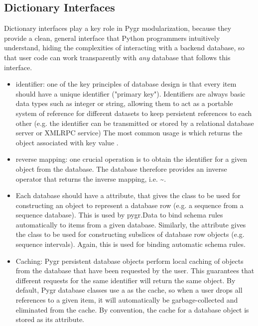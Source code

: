 \documentclass{howto}
\begin{document}
\subsection{Dictionary Interfaces}
Dictionary interfaces play a key role in Pygr modularization, because they
provide a clean, general interface that Python programmers intuitively
understand, hiding the complexities of interacting with a backend database,
so that user code can work transparently with {\em any} database that
follows this interface.
\begin{itemize}
\item identifier: one of the key principles of database
design is that every item should have a unique identifier ("primary key").
Identifiers are always basic data types such as integer or string, allowing
them to act as a portable system of reference for different datasets to keep
persistent references to each other (e.g. the identifier can be transmitted  
or stored by a relational database server or XMLRPC service)
The most common usage is  which returns the object associated
with key value .

\item reverse mapping: one crucial operation is to obtain the identifier for
a given object from the database.  The database therefore provides an
inverse operator that returns the inverse mapping, i.e. 
\textasciitilde{}.

\item Each database should have a  attribute, that 
gives the class to be used for constructing an object to represent a 
database row (e.g. a sequence from a sequence database).  
This is used by pygr.Data to bind schema rules automatically
to items from a given database.  Similarly, the  attribute
gives the class to be used for constructing subslices of database row 
objects (e.g. sequence intervals).  Again, this is used for binding automatic
schema rules.

\item Caching: Pygr persistent database objects perform local caching of objects
from the database that have been requested by the user.  This guarantees that
different requests for the same identifier will return the same object.
By default, Pygr database classes use a 
as the cache, so when a user drops all references to a given item,
it will automatically be garbage-collected and eliminated from the cache.
By convention, the cache for a database object is stored as its
 attribute.


\end{itemize}
\end{document}
